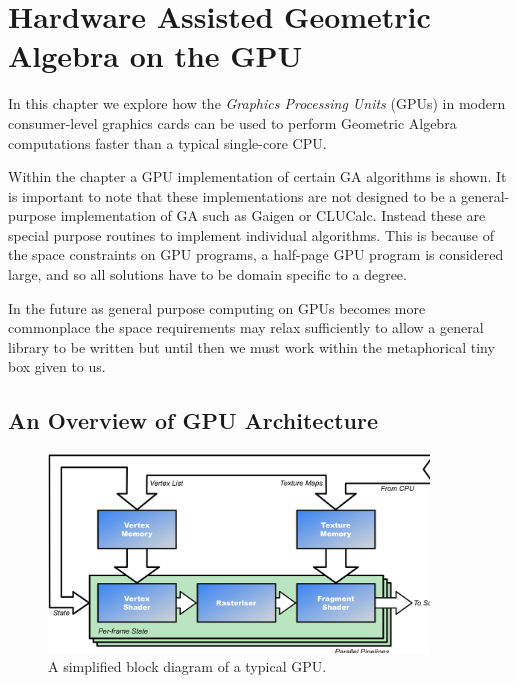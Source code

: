 \begin{savequote}
\end{savequote}

\chapter{Hardware Assisted Geometric Algebra on the GPU}
\label{chap:gpu}

In this chapter we explore how the \emph{Graphics Processing
Units} (GPUs) in modern consumer-level graphics cards can be
used to perform Geometric Algebra computations faster than a 
typical single-core CPU.

Within the chapter a GPU implementation of certain GA algorithms is
shown. It is important to note that these implementations are not
designed to be a general-purpose implementation of GA such as Gaigen or
CLUCalc. Instead these are special purpose routines to implement 
individual algorithms. This is because of the space constraints on 
GPU programs, a half-page GPU program is considered large, and so
all solutions have to be domain specific to a degree.

In the future as general purpose computing on GPUs becomes more commonplace
the space requirements may relax sufficiently to allow a general library to
be written but until then we must work within the metaphorical 
tiny box given to us.

\section{An Overview of GPU Architecture}

\begin{figure}
\centering
\includegraphics[width=0.9\textwidth]{gpu_architecture}
\caption{\label{fig:gpu_architecture}%
  A simplified block diagram of a typical GPU.}
\end{figure}

